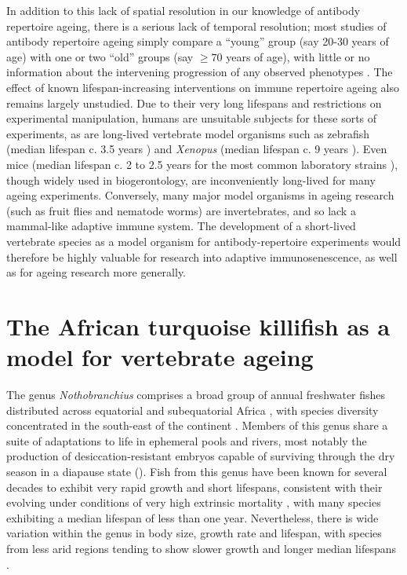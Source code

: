 In addition to this lack of spatial resolution in our knowledge of antibody repertoire ageing, there is a serious lack of temporal resolution; most studies of antibody repertoire ageing simply compare a ``young'' group (say 20-30 years of age) with one or two ``old'' groups (say $\geq70$ years of age), with little or no information about the intervening progression of any observed phenotypes \parencite{debourcy2017ageing,tabibiankeissar2016ageing}. The effect of known lifespan-increasing interventions on immune repertoire ageing also remains largely unstudied. Due to their very long lifespans and restrictions on experimental manipulation, humans are unsuitable subjects for these sorts of experiments, as are long-lived vertebrate model organisms such as zebrafish (median lifespan c. 3.5 years \parencite{gerhard2002zebrafish}) and \textit{Xenopus} (median lifespan c. 9 years \parencite{bowler1977longevity}). Even mice (median lifespan c. 2 to 2.5 years for the most common laboratory strains \parencite{yuan2009aging}), though widely used in biogerontology, are inconveniently long-lived for many ageing experiments. Conversely, many major model organisms in ageing research (such as fruit flies and nematode worms) are invertebrates, and so lack a mammal-like adaptive immune system. The development of a short-lived vertebrate species as a model organism for antibody-repertoire experiments would therefore be highly valuable for research into adaptive immunosenescence, as well as for ageing research more generally.

\section{The African turquoise killifish as a model for vertebrate ageing}
\label{sec:intro_killifish}

The genus \textit{Nothobranchius} comprises a broad group of annual freshwater fishes distributed across equatorial and subequatorial Africa \parencite{valdesalici2003lifespan}, with species diversity concentrated in the south-east of the continent \parencite{genade2005annual}. Members of this genus share a suite of adaptations to life in ephemeral pools and rivers, most notably the production of desiccation-resistant embryos capable of surviving through the dry season in a diapause state \parencite{genade2005annual} (). Fish from this genus have been known for several decades to  exhibit very rapid growth and short lifespans, consistent with their evolving under conditions of very high extrinsic mortality \parencite{valdesalici2003lifespan}, with many species exhibiting a median lifespan of less than one year. Nevertheless, there is wide variation within the genus in body size, growth rate and lifespan, with species from less arid regions tending to show slower growth and longer median lifespans \parencite{genade2005annual}.

